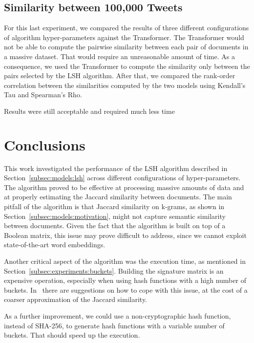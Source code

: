 \documentclass[runningheads]{llncs}
\begin{document}
\subsection{Similarity between 100,000 Tweets}
\label{subsec:experiments:100k}

For this last experiment, we compared the results of three different configurations of algorithm hyper-parameters against the Transformer. The Transformer would not be able to compute the pairwise similarity between each pair of documents in a massive dataset. That would require an unreasonable amount of time. As a consequence, we used the Transformer to compute the similarity only between the pairs selected by the LSH algorithm. After that, we compared the rank-order correlation between the similarities computed by the two models using Kendall's Tau and Spearman's Rho.


Results were still acceptable and required much less time


\section{Conclusions}
\label{sec:conclusions}

This work investigated the performance of the LSH algorithm described in Section~\ref{subsec:models:lsh} across different configurations of hyper-parameters. The algorithm proved to be effective at processing massive amounts of data and at properly estimating the Jaccard similarity between documents. The main pitfall of the algorithm is that Jaccard similarity on k-grams, as shown in Section~\ref{subsec:models:motivation}, might not capture semantic similarity between documents. Given the fact that the algorithm is built on top of a Boolean matrix, this issue may prove difficult to address, since we cannot exploit state-of-the-art word embeddings.

Another critical aspect of the algorithm was the execution time, as mentioned in Section~\ref{subsec:experiments:buckets}. Building the signature matrix is an expensive operation, especially when using hash functions with a high number of buckets. In~\cite{leskovec_2020} there are suggestions on how to cope with this issue, at the cost of a coarser approximation of the Jaccard similarity.

As a further improvement, we could use a non-cryptographic hash function, instead of SHA-256, to generate hash functions with a variable number of buckets. That should speed up the execution.
\end{document}
